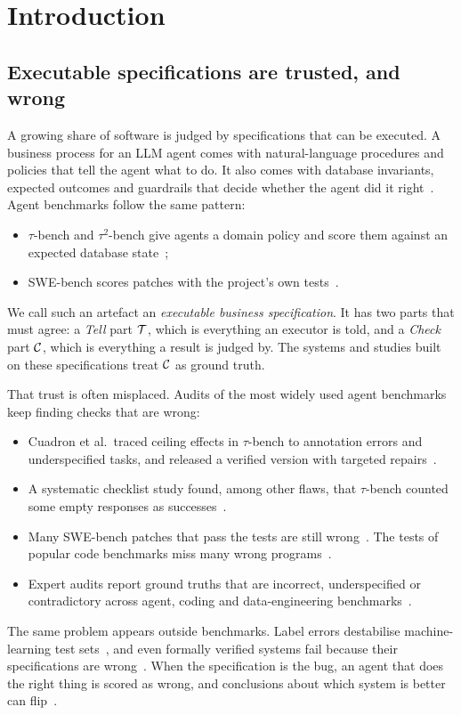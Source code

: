 \section{Introduction}
\label{sec:intro}

\subsection{Executable specifications are trusted, and wrong}

A growing share of software is judged by specifications that can be executed. A business process for an LLM agent comes with natural-language procedures and policies that tell the agent what to do. It also comes with database invariants, expected outcomes and guardrails that decide whether the agent did it right~\cite{calvanese2026agentic,li2025sopbench,levy2026webagentbench}. Agent benchmarks follow the same pattern:
\begin{itemize}[leftmargin=*]
\item $\tau$-bench and $\tau^2$-bench give agents a domain policy and score them against an expected database state~\cite{yao2025bench,barres2026bench};
\item SWE-bench scores patches with the project's own tests~\cite{jimenez2024swe}.
\end{itemize}
We call such an artefact an \emph{executable business specification}. It has two parts that must agree: a \emph{Tell} part $\mathcal{T}$, which is everything an executor is told, and a \emph{Check} part $\mathcal{C}$, which is everything a result is judged by. The systems and studies built on these specifications treat $\mathcal{C}$ as ground truth.

That trust is often misplaced. Audits of the most widely used agent benchmarks keep finding checks that are wrong:
\begin{itemize}[leftmargin=*]
\item Cuadron et al.\ traced ceiling effects in $\tau$-bench to annotation errors and underspecified tasks, and released a verified version with targeted repairs~\cite{cuadron2025saber}.
\item A systematic checklist study found, among other flaws, that $\tau$-bench counted some empty responses as successes~\cite{zhu2025establishing}.
\item Many SWE-bench patches that pass the tests are still wrong~\cite{wang2026solved,yu2025utboost,yu2026swe}. The tests of popular code benchmarks miss many wrong programs~\cite{liu2023your}.
\item Expert audits report ground truths that are incorrect, underspecified or contradictory across agent, coding and data-engineering benchmarks~\cite{zanoli2026elt,bhat2026benchmarking,wang2026automated,cao2026policy}.
\end{itemize}
The same problem appears outside benchmarks. Label errors destabilise machine-learning test sets~\cite{northcutt2021pervasive,gema2025done}, and even formally verified systems fail because their specifications are wrong~\cite{fonseca2017empirical}. When the specification is the bug, an agent that does the right thing is scored as wrong, and conclusions about which system is better can flip~\cite{northcutt2021pervasive,cao2026policy}.


